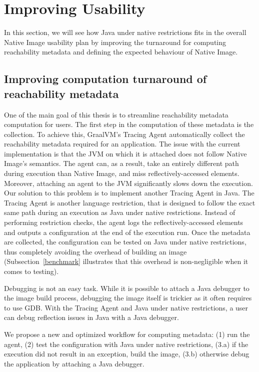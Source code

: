 \section{Improving Usability}
In this section, we will see how Java under native restrictions fits in the overall Native Image usability plan by improving the turnaround for computing reachability metadata and defining the expected behaviour of Native Image. 

\subsection{Improving computation turnaround of reachability metadata}
One of the main goal of this thesis is to streamline reachability metadata computation for users.
The first step in the computation of these metadata is the collection. To achieve this, GraalVM's Tracing Agent automatically collect the reachability metadata required for an application. The issue with the current implementation is that the JVM on which it is attached does not follow Native Image's semantics. The agent can, as a result, take an entirely different path during execution than Native Image, and miss reflectively-accessed elements. Moreover, attaching an agent to the JVM significantly slows down the execution.
Our solution to this problem is to implement another Tracing Agent in Java. The Tracing Agent is another language restriction, that is designed to follow the exact same path during an execution as Java under native restrictions. Instead of performing restriction checks, the agent logs the reflectively-accessed elements and outputs a configuration at the end of the execution run. 
Once the metadata are collected, the configuration can be tested on Java under native restrictions, thus completely avoiding the overhead of building an image (Subsection~\ref{benchmark} illustrates that this overhead is non-negligible when it comes to testing).  

Debugging  is not an easy task. While it is possible to attach a Java debugger to the image build process, debugging the image itself is trickier as it often requires to use GDB. With the Tracing Agent and Java under native restrictions, a user can debug reflection issues in Java with a Java debugger. 

We propose a new and optimized workflow for computing metadata: (1) run the agent, (2) test the configuration with Java under native restrictions, (3.a) if the execution did not result in an exception, build the image, (3.b) otherwise debug the application by attaching a Java debugger.

